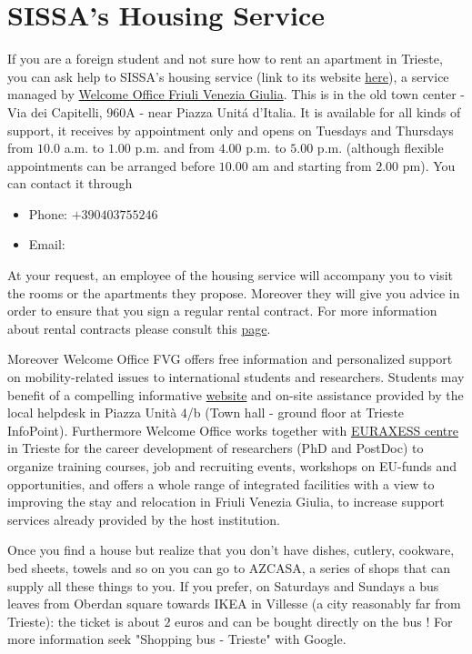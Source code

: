 \documentclass{sissavademecum}
\begin{document}
\section{SISSA's Housing Service}

If you are a foreign student and not sure how to rent an apartment in Trieste, you can ask help to SISSA's housing service (link to its website \href{https://www.sissa.it/housing}{here}), a service managed by \href{http://www.welcomeoffice.fvg.it}{Welcome Office Friuli Venezia Giulia}. This is in the old town center - Via dei Capitelli, $960$A - near Piazza Unit\'a d'Italia. It is available for all kinds of support, it receives by appointment only and opens on Tuesdays and Thursdays from $10.0$ a.m. to $1.00$ p.m. and from $4.00$ p.m. to $5.00$ p.m. (although flexible appointments can be arranged before $10.00$ am and starting from $2.00$ pm). You can contact it through 
\begin{itemize}
	\item Phone: $+39 040 375 5246$
	\item Email: 
\end{itemize}

At your request, an employee of the housing service will accompany you to visit the rooms or the apartments they propose. Moreover they will give you advice in order to ensure that you sign a regular rental contract. For more information about rental contracts please consult this \href{https://wiki.sissa.it/students/index.php/House_rental_contract}{page}.

Moreover Welcome Office FVG offers free information and personalized support on mobility-related issues to international students and researchers. Students may benefit of a compelling informative \href{link http://www.welcomeoffice.fvg.it/news/}{website} and on-site assistance provided by the local helpdesk in Piazza Unit\`a $4$/b (Town hall - ground floor at Trieste InfoPoint). Furthermore Welcome Office works together with \href{https://euraxess.ec.europa.eu/}{EURAXESS centre} in Trieste for the career development of researchers (PhD and PostDoc) to organize training courses, job and recruiting events, workshops on EU-funds and opportunities, and offers a whole range of integrated facilities with a view to improving the stay and relocation in Friuli Venezia Giulia, to increase support services already provided by the host institution. 

Once you find a house but realize that you don't have dishes, cutlery, cookware, bed sheets, towels and so on you can go to AZCASA, a series of shops that can supply all these things to you. If you prefer, on Saturdays and Sundays a bus leaves from Oberdan square towards IKEA in Villesse (a city reasonably far from Trieste): the ticket is about $2$ euros and can be bought directly on the bus ! For more information seek "Shopping bus - Trieste" with Google.
\end{document}
